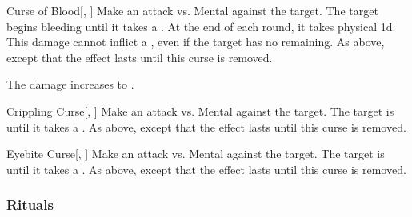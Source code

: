 \lowercase{\hypertarget{spell:Curse of Blood}{}}\label{spell:Curse of Blood}
\begin{freeability}[Rank 6]{\hypertarget{spell:Curse of Blood}{Curse of Blood}}[, ]
Make an attack vs. Mental against the target.
\hit The target begins bleeding until it takes a .
At the end of each round, it takes physical  \minus1d.
This damage cannot inflict a , even if the target has no  remaining.
\crit As above, except that the effect lasts until this curse is removed.

\rankline
{} The damage increases to .
\end{freeability}
\vspace{0.25em}



\lowercase{\hypertarget{spell:Crippling Curse}{}}\label{spell:Crippling Curse}
\begin{freeability}[Rank 8]{\hypertarget{spell:Crippling Curse}{Crippling Curse}}[, ]
Make an attack vs. Mental against the target.
\hit The target is  until it takes a .
\crit As above, except that the effect lasts until this curse is removed.
\end{freeability}
\vspace{0.25em}



\lowercase{\hypertarget{spell:Eyebite Curse}{}}\label{spell:Eyebite Curse}
\begin{freeability}[Rank 8]{\hypertarget{spell:Eyebite Curse}{Eyebite Curse}}[, ]
Make an attack vs. Mental against the target.
\hit The target is  until it takes a .
\crit As above, except that the effect lasts until this curse is removed.
\end{freeability}
\vspace{0.25em}



\subsubsection{Rituals}


